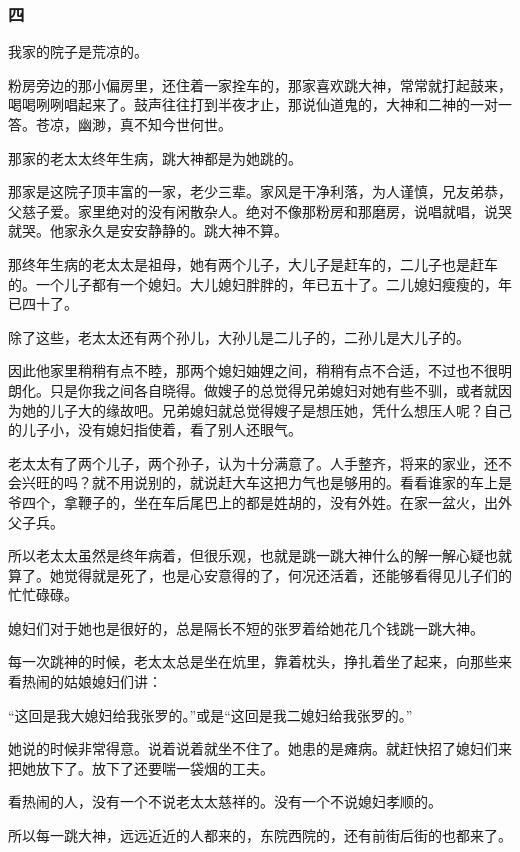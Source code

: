 \subsubsection*{四}
\par 我家的院子是荒凉的。
\par 粉房旁边的那小偏房里，还住着一家拴车的，那家喜欢跳大神，常常就打起鼓来，喝喝咧咧唱起来了。鼓声往往打到半夜才止，那说仙道鬼的，大神和二神的一对一答。苍凉，幽渺，真不知今世何世。
\par 那家的老太太终年生病，跳大神都是为她跳的。
\par 那家是这院子顶丰富的一家，老少三辈。家风是干净利落，为人谨慎，兄友弟恭，父慈子爱。家里绝对的没有闲散杂人。绝对不像那粉房和那磨房，说唱就唱，说哭就哭。他家永久是安安静静的。跳大神不算。
\par 那终年生病的老太太是祖母，她有两个儿子，大儿子是赶车的，二儿子也是赶车的。一个儿子都有一个媳妇。大儿媳妇胖胖的，年已五十了。二儿媳妇瘦瘦的，年已四十了。
\par 除了这些，老太太还有两个孙儿，大孙儿是二儿子的，二孙儿是大儿子的。
\par 因此他家里稍稍有点不睦，那两个媳妇妯娌之间，稍稍有点不合适，不过也不很明朗化。只是你我之间各自晓得。做嫂子的总觉得兄弟媳妇对她有些不驯，或者就因为她的儿子大的缘故吧。兄弟媳妇就总觉得嫂子是想压她，凭什么想压人呢？自己的儿子小，没有媳妇指使着，看了别人还眼气。
\par 老太太有了两个儿子，两个孙子，认为十分满意了。人手整齐，将来的家业，还不会兴旺的吗？就不用说别的，就说赶大车这把力气也是够用的。看看谁家的车上是爷四个，拿鞭子的，坐在车后尾巴上的都是姓胡的，没有外姓。在家一盆火，出外父子兵。
\par 所以老太太虽然是终年病着，但很乐观，也就是跳一跳大神什么的解一解心疑也就算了。她觉得就是死了，也是心安意得的了，何况还活着，还能够看得见儿子们的忙忙碌碌。
\par 媳妇们对于她也是很好的，总是隔长不短的张罗着给她花几个钱跳一跳大神。
\par 每一次跳神的时候，老太太总是坐在炕里，靠着枕头，挣扎着坐了起来，向那些来看热闹的姑娘媳妇们讲：
\par “这回是我大媳妇给我张罗的。”或是“这回是我二媳妇给我张罗的。”
\par 她说的时候非常得意。说着说着就坐不住了。她患的是瘫病。就赶快招了媳妇们来把她放下了。放下了还要喘一袋烟的工夫。
\par 看热闹的人，没有一个不说老太太慈祥的。没有一个不说媳妇孝顺的。
\par 所以每一跳大神，远远近近的人都来的，东院西院的，还有前街后街的也都来了。
